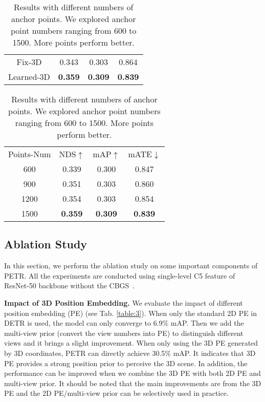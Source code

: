\documentclass[runningheads]{llncs}
\begin{document}
\begin{table}[t!]
\begin{center}
\begin{subtable}[t]{0.45\linewidth}
\begin{tabular}{c|ccc}
        Fix-3D &0.343 &0.303 &0.864\\
        Learned-3D&\textbf{0.359} &\textbf{0.309} &\textbf{0.839}\\
        \hline
        \end{tabular}
        \caption{
``None'' means no anchor points following DETR.
        ``Fix-BEV'' and ``Fix-3D'' mean the grid anchor points in BEV space and 3D space respectively. 
        }
    \end{subtable}
    \setlength{\tabcolsep}{3.4pt}
    \begin{subtable}[t]{0.45\linewidth}
\begin{tabular}{c|ccc}
        \hline\noalign{\smallskip}
        Points-Num & NDS$\uparrow$ & mAP$\uparrow$ & mATE$\downarrow$\\
        \noalign{\smallskip}
        \hline
        \noalign{\smallskip}
600&0.339 &0.300 &0.847\\
        900&0.351 &0.303 &0.860\\
        1200&0.354 &0.303 &0.854\\
        1500&\textbf{0.359} &\textbf{0.309} &\textbf{0.839}\\
        \hline
        \end{tabular}
        \caption{Results with different numbers of anchor points. We explored anchor point numbers ranging from 600 to 1500. More points perform better.}
    \end{subtable}
    \label{tab:array}
\end{center}
\end{table}


\subsection{Ablation Study}
In this section, we perform the ablation study on some important components of PETR. All the experiments are conducted using single-level C5 feature of ResNet-50 backbone without the CBGS~\cite{zhu2019class}.

\noindent \textbf{Impact of 3D Position Embedding.}
We evaluate the impact of different position embedding (PE) (see Tab. \ref{table:3}). When only the standard 2D PE in DETR is used, the model can only converge to 6.9\% mAP. Then we add the multi-view prior (convert the view numbers into PE) to distinguish different views and it brings a slight improvement. When only using the 3D PE generated by 3D coordinates, PETR can directly achieve 30.5\% mAP. It indicates that 3D PE provides a strong position prior to perceive the 3D scene. In addition, the performance can be improved when we combine the 3D PE with both 2D PE and multi-view prior. It should be noted that the main improvements are from the 3D PE and the 2D PE/multi-view prior can be selectively used in practice.
\end{document}
